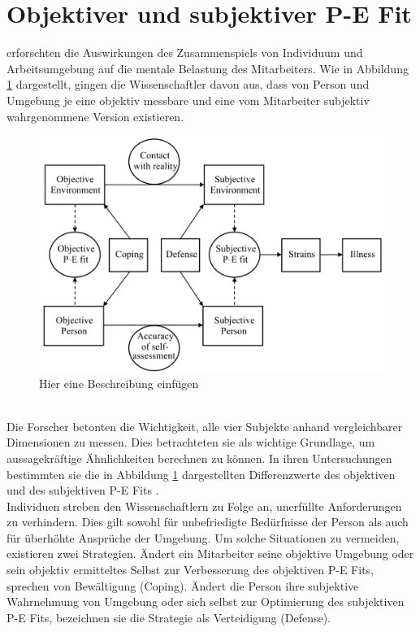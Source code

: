 \section{Objektiver und subjektiver P-E Fit}
\label{ch:personEnvironmentFit:subjektivObjektiv}
\textcite{copingAndAdaption:1974} erforschten die Auswirkungen des Zusammenspiels von Individuum und Arbeitsumgebung auf die mentale Belastung des Mitarbeiters. Wie in Abbildung \ref{fig:personEnvironmentFit:subjektivObjektiv:abb1} dargestellt, gingen die Wissenschaftler davon aus, dass von Person und Umgebung je eine objektiv messbare und eine vom Mitarbeiter subjektiv wahrgenommene Version existieren. \\
\begin{figure}[h]
	\centering
	\includegraphics[width=1\textwidth]{gfx/subjektivObjektivPEFit.png}
	\caption{Hier eine Beschreibung einfügen \cite[S. 22]{edwards:2008}}
	\label{fig:personEnvironmentFit:subjektivObjektiv:abb1}
\end{figure}\\
Die Forscher betonten die Wichtigkeit, alle vier Subjekte anhand vergleichbarer Dimensionen zu messen. Dies betrachteten sie als wichtige Grundlage, um aussagekräftige Ähnlichkeiten berechnen zu können. In ihren Untersuchungen bestimmten sie die in Abbildung \ref{fig:personEnvironmentFit:subjektivObjektiv:abb1} dargestellten Differenzwerte des objektiven und des subjektiven P-E Fits \cite{copingAndAdaption:1974}.\\
Individuen streben den Wissenschaftlern zu Folge an, unerfüllte Anforderungen zu verhindern. Dies gilt sowohl für unbefriedigte Bedürfnisse der Person als auch für überhöhte Ansprüche der Umgebung. Um solche Situationen zu vermeiden, existieren zwei Strategien. Ändert ein Mitarbeiter seine objektive Umgebung oder sein objektiv ermitteltes Selbst zur Verbesserung des objektiven P-E Fits, sprechen \textcite{copingAndAdaption:1974} von Bewältigung (Coping). Ändert die Person ihre subjektive Wahrnehmung von Umgebung oder sich selbst zur Optimierung des subjektiven P-E Fits, bezeichnen sie die Strategie als Verteidigung (Defense).\\

